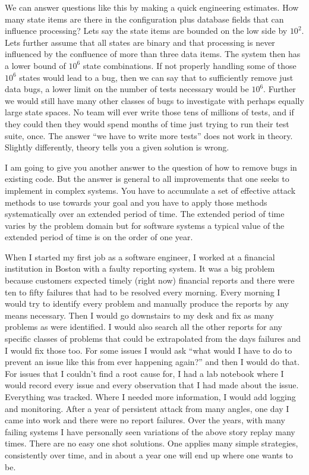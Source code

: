 We can answer questions like this by making a quick engineering estimates. How many state items are there in the configuration plus
database fields that can influence processing? Lets say the state items are bounded on the low side by $10^2$. Lets further assume
that all states are binary and
that processing is never influenced by the confluence of more than three data items. The system then has a lower bound of $10^6$ state combinations.
If not properly handling some of those $10^6$ states would lead to a bug, then we can say that to sufficiently
remove just data bugs, a lower limit on the number of tests necessary would be $10^6$. Further we would still have many other classes of bugs
to investigate with perhaps equally large state spaces. No team will ever write those tens of millions of tests, and if they could then they would
spend months of time just trying to run their test suite, once. The answer ``we have to write more tests'' does not work in theory. Slightly differently,
theory tells you a given solution is wrong.

I am going to give you another answer to the question of how to remove bugs in existing code. But the answer is general to all improvements
that one seeks to implement in complex systems. You have to accumulate a set of effective attack methods to use towards your goal and
you have to apply those methods systematically over an extended period of time. The extended period of time varies by the problem domain
but for software systems a typical value of the extended period of time is on the order of one year.

When I started my first job as a software engineer, I worked at a financial institution in Boston with a faulty reporting system. It was a big
problem because customers expected timely (right now) financial reports and there were ten to fifty failures that had to be resolved every morning. Every
morning I would try to identify every problem and manually produce the reports by any means necessary. Then I would go downstairs to my
desk and fix as many problems as were identified. I would also search all the other reports for any specific classes of problems that could be
extrapolated from the days failures and I would fix those too. For some issues I would ask ``what would I have to do to prevent an issue like
this from ever happening again?'' and then I would do that. For issues that I couldn't find a root cause for, I had a lab notebook where I
would record every issue and every observation that I had made about the issue. Everything was tracked. Where I needed more information,
I would add logging and monitoring. After a year of persistent attack from many angles, one day I came into work and there were no report
failures. Over the years, with many failing systems I have personally seen variations of the above story replay many times. There are no easy one
shot solutions. One applies many simple strategies, consistently over time, and in about a year one will end up where one wants to be.

